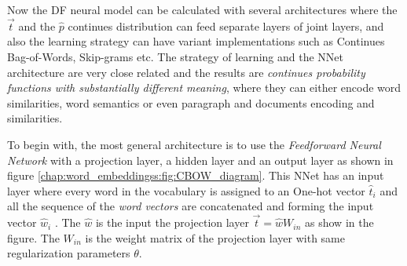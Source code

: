 Now the DF neural model can be calculated with several architectures where the $\vec{t}$ and the $\hat{p}$ continues distribution can feed separate layers of joint layers, and also the learning strategy can have variant implementations such as Continues Bag-of-Words, Skip-grams etc. The strategy of learning and the NNet architecture are very close related and the results are \textit{continues probability functions with substantially different meaning}, where they can either encode word similarities, word semantics or even paragraph and documents encoding and similarities. 

To begin with, the most general architecture is to use the \textit{Feedforward Neural Network} with a projection layer, a hidden layer and an output layer as shown in figure \ref{chap:word_embeddingss:fig:CBOW_diagram}. This NNet has an input layer where every word in the vocabulary is assigned to an One-hot vector $\hat{t}_{i}$ and all the sequence of the \textit{word vectors} are concatenated and forming the input vector $\hat{w}_{i}$ . The $\hat{w}$ is the input the projection layer $\vec{t} = \hat{w}W_{in}$ as show in the figure. The $W_{in}$ is the weight matrix of the projection layer with same regularization parameters $\theta$.

